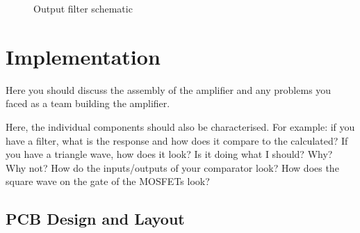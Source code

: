 \documentclass[a4paper,11pt]{article}
\begin{document}
\begin{figure}[h!]
    \centering
    \caption{Output filter schematic}
\end{figure}

\section{Implementation}

Here you should discuss the assembly of the amplifier and any problems you faced as a team building the amplifier.

Here, the individual components should also be characterised. For example: if you have a filter, what is the response and how does it compare to the calculated? If you have a triangle wave, how does it look? Is it doing what I should? Why? Why not? How do the inputs/outputs of your comparator look? How does the square wave on the gate of the MOSFETs look?

\subsection{PCB Design and Layout}
\end{document}
